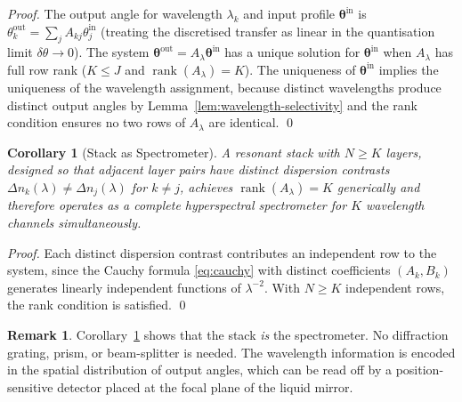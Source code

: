 \documentclass[11pt,twocolumn,a4paper]{article}
\theoremstyle{plain}
\newtheorem{corollary}[theorem]{Corollary}
\theoremstyle{definition}
\newtheorem{remark}[theorem]{Remark}
\theoremstyle{remark}
\DeclareMathOperator{\rank}{rank}
\begin{document}
\begin{proof}
The output angle for wavelength $\lambda_k$ and input profile $\bm{\theta}^\text{in}$ is $\theta_k^\text{out}=\sum_j A_{kj}\theta_j^\text{in}$ (treating the discretised transfer as linear in the quantisation limit $\delta\theta\to 0$). The system $\bm{\theta}^\text{out}=A_\lambda\bm{\theta}^\text{in}$ has a unique solution for $\bm{\theta}^\text{in}$ when $A_\lambda$ has full row rank ($K\leq J$ and $\rank(A_\lambda)=K$). The uniqueness of $\bm{\theta}^\text{in}$ implies the uniqueness of the wavelength assignment, because distinct wavelengths produce distinct output angles by Lemma~\ref{lem:wavelength-selectivity} and the rank condition ensures no two rows of $A_\lambda$ are identical. \qed
\end{proof}

\begin{corollary}[Stack as Spectrometer]
\label{cor:spectrometer}
A resonant stack with $N\geq K$ layers, designed so that adjacent layer pairs have distinct dispersion contrasts $\Delta n_k(\lambda)\neq\Delta n_j(\lambda)$ for $k\neq j$, achieves $\rank(A_\lambda)=K$ generically and therefore operates as a complete hyperspectral spectrometer for $K$ wavelength channels simultaneously.
\end{corollary}

\begin{proof}
Each distinct dispersion contrast contributes an independent row to the system, since the Cauchy formula \eqref{eq:cauchy} with distinct coefficients $(A_k,B_k)$ generates linearly independent functions of $\lambda^{-2}$. With $N\geq K$ independent rows, the rank condition is satisfied. \qed
\end{proof}

\begin{remark}
Corollary~\ref{cor:spectrometer} shows that the stack \emph{is} the spectrometer. No diffraction grating, prism, or beam-splitter is needed. The wavelength information is encoded in the spatial distribution of output angles, which can be read off by a position-sensitive detector placed at the focal plane of the liquid mirror.
\end{remark}
\end{document}
